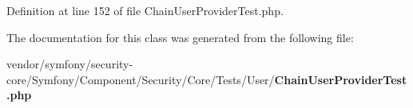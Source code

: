 Definition at line 152 of file Chain\+User\+Provider\+Test.\+php.



The documentation for this class was generated from the following file\+:\begin{DoxyCompactItemize}
\item 
vendor/symfony/security-\/core/\+Symfony/\+Component/\+Security/\+Core/\+Tests/\+User/{\bf Chain\+User\+Provider\+Test.\+php}\end{DoxyCompactItemize}
